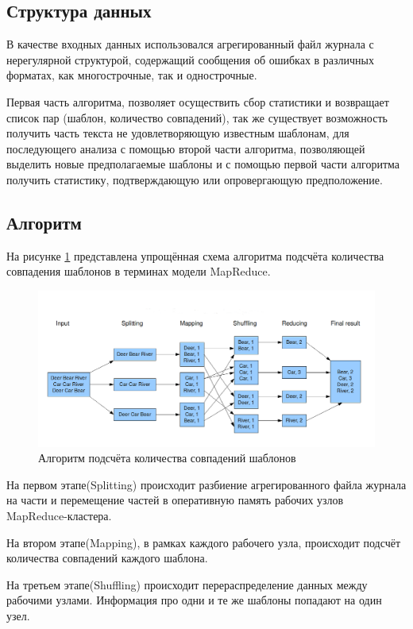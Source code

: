 \subsection{Структура данных}
В качестве входных данных использовался агрегированный файл журнала с
нерегулярной структурой, содержащий сообщения об ошибках в различных форматах,
как многострочные, так и однострочные.

Первая часть алгоритма, позволяет осуществить сбор статистики
и возвращает список пар (шаблон, количество совпадений), так же существует
возможность получить часть текста не удовлетворяющую известным шаблонам,
для последующего анализа с помощью второй части алгоритма, позволяющей
выделить новые предполагаемые шаблоны и с помощью первой части алгоритма
получить статистику, подтверждающую или опровергающую предположение.

\subsection{Алгоритм}
На рисунке \ref{fig:algo} представлена упрощённая схема алгоритма подсчёта
количества совпадения шаблонов в терминах модели MapReduce.

\begin{figure}[h]
  \centering
  \includegraphics[width=\textwidth]{pics/mapreduce.png}
  \caption{Алгоритм подсчёта количества совпадений шаблонов}
  \label{fig:algo}
\end{figure}

На первом этапе(Splitting) происходит разбиение агрегированного файла журнала
на части и перемещение частей в оперативную память рабочих узлов
MapReduce-кластера.

На втором этапе(Mapping), в рамках каждого рабочего узла, происходит подсчёт
количества совпадений каждого шаблона.

На третьем этапе(Shuffling) происходит перераспределение данных между рабочими
узлами. Информация про одни и те же шаблоны попадают на один узел.

